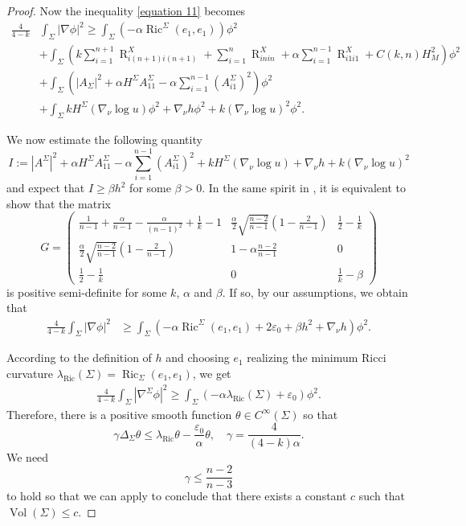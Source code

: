 \documentclass[11pt,letterpaper]{amsart}
\DeclareMathOperator{\Vol}{Vol}
\DeclareMathOperator{\Ric}{Ric}
\DeclareMathOperator{\R}{R}
\theoremstyle{definition}
\theoremstyle{remark}
\numberwithin{equation}{section}
\begin{document}
\begin{proof}
Now the inequality \eqref{equation 11} becomes
  \begin{align*}
    \frac{4}{4-k}& \int_\Sigma |\nabla\phi|^2\geq   \int_{\Sigma} (-\alpha\Ric^\Sigma(e_1,e_1))\phi^2\\
    &+\int_{\Sigma}\left(k\sum_{i=1}^{n+1}\R^X_{i(n+1)i(n+1)}+\sum_{i=1}^{n}\R^X_{inin}+\alpha\sum_{i=1}^{n-1}\R^X_{i1i1}+C(k,n)H_M^2 \right)\phi^2\\\nonumber
   &+ \int_\Sigma \left(|A_\Sigma|^2+ \alpha H^\Sigma A^\Sigma_{11}-\alpha\sum_{i=1}^{n-1}
(A^\Sigma_{i1})^2\right)\phi^2\\
     &+\int_{\Sigma} k H^\Sigma(\nabla_\nu \log u) \phi^2+\nabla_\nu h \phi^2+k(\nabla_\nu \log u)^2\phi^2.
 \end{align*}

We now estimate the following quantity 
 \[I:=|A^\Sigma|^2+ \alpha H^\Sigma A^\Sigma_{11}-\alpha\sum_{i=1}^{n-1}
(A^\Sigma_{i1})^2+kH^\Sigma(\nabla_\nu \log u)+\nabla_\nu h+ k(\nabla_\nu \log u)^2\]
and expect that $I\geq \beta h^2$ for some $\beta>0$.
In the same spirit in \cite[Page 11-12]{mazet}, it is equivalent to show that the matrix
\begin{equation}\label{cond2}
G=\begin{pmatrix}
    \frac{1}{n-1}+\frac{\alpha}{n-1}-\frac{\alpha}{(n-1)^2}+\frac{1}{k}-1 & \frac{\alpha}{2}\sqrt{\frac{n-2}{n-1}}(1-\frac{2}{n-1}) & \frac{1}{2}-\frac{1}{k} \\
    \frac{\alpha}{2}\sqrt{\frac{n-2}{n-1}}(1-\frac{2}{n-1}) & 1-\alpha\frac{n-2}{n-1} & 0\\
    \frac{1}{2}-\frac{1}{k} & 0 & \frac{1}{k}-\beta 
\end{pmatrix} 
\end{equation}
is positive semi-definite for some $k$, $\alpha$ and $\beta$. If so, by our assumptions, we obtain that
 \begin{align*}
    \frac{4}{4-k} \int_\Sigma |\nabla\phi|^2&\geq  \int_{\Sigma} (-\alpha\Ric^\Sigma(e_1,e_1)+2\varepsilon_0+\beta h^2+\nabla_\nu h)\phi^2.
 \end{align*}

According to the definition of $h$ and choosing $e_1$ realizing the minimum Ricci curvature $\lambda_{\Ric}(\Sigma)=\Ric_{\Sigma}(e_1,e_1)$, we get
\begin{equation*}
\begin{split}
    \frac{4}{4-k}\int_{\Sigma}|\nabla^{\Sigma}\phi|^2  \geqslant \int_{\Sigma}\left(- \alpha\lambda_{\Ric}(\Sigma)+\varepsilon_0\right)\phi^2.
    \end{split}
\end{equation*}
Therefore, there is a positive smooth function $\theta\in C^{\infty}(\Sigma)$ so that
\begin{equation*}
    \gamma\Delta_\Sigma \theta\leq \lambda_{\Ric} \theta-\frac{\varepsilon_0}{\alpha}\theta, \quad \gamma=\frac{4}{(4-k)\alpha}.
\end{equation*}
We need 
\[\gamma\leq \frac{n-2}{n-3}\]
to hold so that we can apply \cite[Theorem 1]{antonelli-xu} to conclude that there exists a constant $c$ such that $\Vol(\Sigma)\leq c.$


\end{proof}
\end{document}
